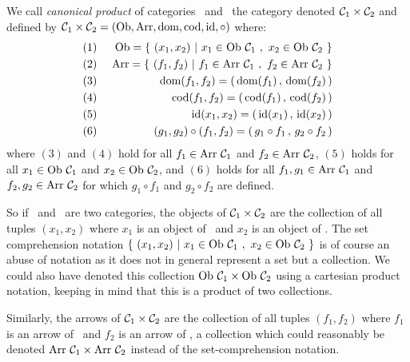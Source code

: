 \begin{defin}\label{Cat:def:canonical:product}
    We call {\em canonical product} of categories \Cone\ and \Ctwo\ the category 
    denoted $\mbox{${\cal C}_{1}$}\times\mbox{${\cal C}_{2}$}$ and defined by $\mbox{${\cal C}_{1}$}\times\mbox{${\cal C}_{2}$}=
    (\mbox{\rm Ob}, \mbox{\rm Arr}, \mbox{\rm dom}, \mbox{\rm cod}, \mbox{\rm id}, \circ)$ where:
        \begin{eqnarray*}
            (1)&\ &\ob=\{\ (x_{1},x_{2})\ |\ x_{1}\in\ob\ \Cone\ 
                                          ,\ x_{2}\in\ob\ \Ctwo\ \}\\
            (2)&\ &\arr=\{\ (f_{1},f_{2})\ |\ f_{1}\in\arr\ \Cone\ 
                                           ,\ f_{2}\in\arr\ \Ctwo\ \}\\
            (3)&\ &\dom(f_{1},f_{2})=(\,\dom(f_{1})\,,\,\dom(f_{2})\,)\\
            (4)&\ &\cod(f_{1},f_{2})=(\,\cod(f_{1})\,,\,\cod(f_{2})\,)\\
            (5)&\ &\id(x_{1},x_{2}) =(\,\id(x_{1})\,,\,\id(x_{2})\,)\\
            (6)&\ &(g_{1},g_{2})\circ(f_{1},f_{2})=(\,g_{1}\circ f_{1}\,
                                                   ,\,g_{2}\circ f_{2}\,)
        \end{eqnarray*}
    where $(3)$ and $(4)$ hold for all $f_{1}\in\mbox{\rm Arr}\ \mbox{${\cal C}_{1}$}$ and $f_{2}
    \in\mbox{\rm Arr}\ \mbox{${\cal C}_{2}$}$, $(5)$ holds for all $x_{1}\in\mbox{\rm Ob}\ \mbox{${\cal C}_{1}$}$ and $x_{2}
    \in\mbox{\rm Ob}\ \mbox{${\cal C}_{2}$}$, and $(6)$ holds for all $f_{1},g_{1}\in\arr\ \Cone$
    and $f_{2},g_{2}\in\arr\ \Ctwo$ for which $g_{1}\circ f_{1}$ and
    $g_{2}\circ f_{2}$ are defined.
\end{defin}

So if \Cone\ and \Ctwo\ are two categories, the objects of $\mbox{${\cal C}_{1}$}\times\mbox{${\cal C}_{2}$}$
are the collection of all tuples $(x_{1}, x_{2})$ where $x_{1}$ is an
object of \Cone\ and $x_{2}$ is an object of \Ctwo. The set comprehension 
notation $\{\ (x_{1},x_{2})\ |\ x_{1}\in\ob\ \Cone\ ,\ x_{2}\in\ob\ \Ctwo\ \}$
is of course an abuse of notation as it does not in general represent a set
but a collection. We could also have denoted this collection 
$\ob\ \Cone\times\ob\ \Ctwo$ using a cartesian product notation, keeping 
in mind that this is a product of two collections.

Similarly, the arrows of $\mbox{${\cal C}_{1}$}\times\mbox{${\cal C}_{2}$}$ are the collection of all tuples
$(f_{1},f_{2})$ where $f_{1}$ is an arrow of \Cone\ and $f_{2}$ is an arrow
of \Ctwo, a collection which could reasonably be denoted $\mbox{\rm Arr}\ \mbox{${\cal C}_{1}$}\times
\mbox{\rm Arr}\ \mbox{${\cal C}_{2}$}$ instead of the set-comprehension notation.

